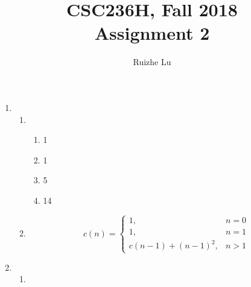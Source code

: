 \documentclass{article}
\title{CSC236H, Fall 2018\\
Assignment 2\\
}
\author{Ruizhe Lu}
\begin{document}
\maketitle

\begin{enumerate}

  \item 
    \begin{enumerate}
  
    \item   {} 
            \begin{enumerate} [label=(\alph*)]
            \item 1

            \item 1


            \item 5


            \item 14
            \end{enumerate}

    \item   {}
            \begin{equation}
                c(n) = \begin{cases}
                    1,  & n = 0 \\
                    1,  & n = 1 \\
                    c(n-1) + (n-1)^2,   & n > 1
                \end{cases}
    \end{equation}
  \end{enumerate}



\item   
  \begin{enumerate}

    \item {}



\end{enumerate}
\end{enumerate}
\end{document}
